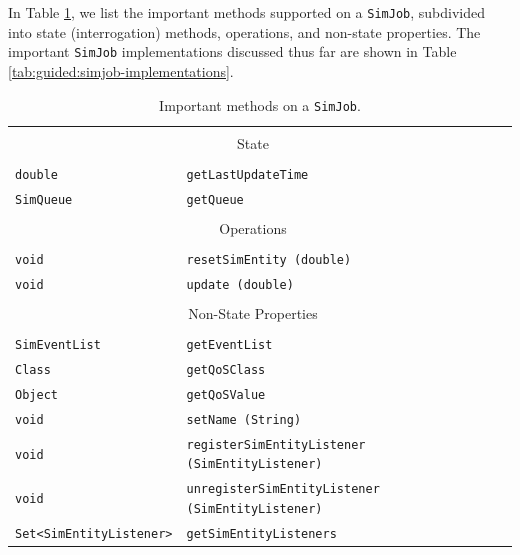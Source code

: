 \documentclass[12pt]{book}
\begin{document}
In Table \ref{tab:guided:simjob-methods},
  we list the important methods supported on a \lstinline|SimJob|,
  subdivided into state (interrogation) methods,
  operations,
  and non-state properties.
The important \lstinline|SimJob| implementations
  discussed thus far are shown
  in Table \ref{tab:guided:simjob-implementations}.

\begin{table}
\label{tab:guided:simjob-methods}
\caption{Important methods on a \texttt{SimJob}.}
\begin{center}
\begin{tabular}{|l|l|l|}
\hline
\multicolumn{2}{|c|}{}      \\
\multicolumn{2}{|c|}{\large State} \\
\multicolumn{2}{|c|}{}      \\
\hline
\lstinline|double|      & \lstinline|getLastUpdateTime|            \\ \hline
\lstinline|SimQueue|    & \lstinline|getQueue|                     \\ \hline
\hline
\multicolumn{2}{|c|}{}                  \\
\multicolumn{2}{|c|}{\large Operations} \\
\multicolumn{2}{|c|}{}                  \\
\hline
\lstinline|void|    & \lstinline|resetSimEntity (double)|                        \\ \hline
\lstinline|void|    & \lstinline|update (double)|                                \\ \hline
\hline
\multicolumn{2}{|c|}{} \\
\multicolumn{2}{|c|}{\large Non-State Properties} \\
\multicolumn{2}{|c|}{}                  \\
\hline
\lstinline|SimEventList| & \lstinline|getEventList|     \\
\hline
\lstinline|Class|  & \lstinline|getQoSClass|            \\
\lstinline|Object| & \lstinline|getQoSValue|            \\
\hline
\lstinline|void|   & \lstinline|setName (String)|       \\
\hline
\lstinline|void|                   & \lstinline|registerSimEntityListener (SimEntityListener)|   \\
\lstinline|void|                   & \lstinline|unregisterSimEntityListener (SimEntityListener)| \\
\lstinline|Set<SimEntityListener>| & \lstinline|getSimEntityListeners|                           \\
\hline
\end{tabular}
\end{center}
\end{table}
\end{document}
